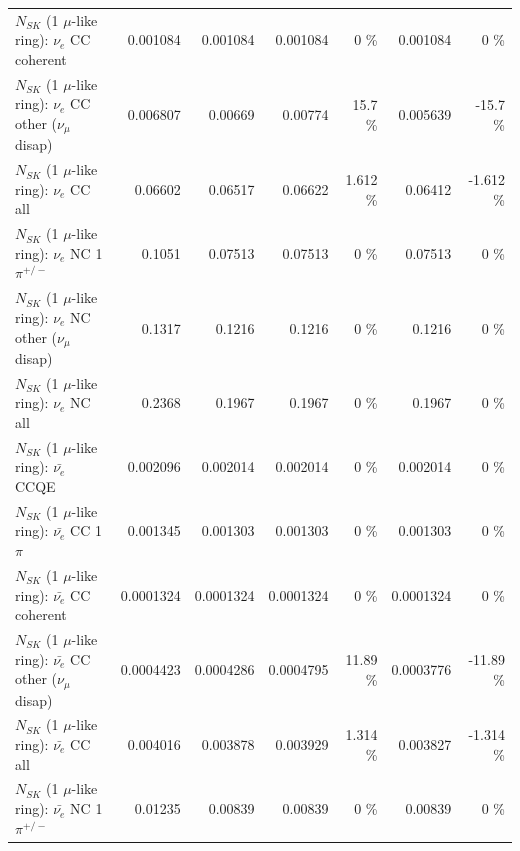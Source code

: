\begin{table}
\begin{tabular}{| l | r | r | r  r | r  r |}
                               $N_{SK}$ (1 $\mu$-like ring): $\nu_e$ CC coherent &        0.001084 &        0.001084 &        0.001084 &        0 \%  &        0.001084 &        0 \%  \\ 
                $N_{SK}$ (1 $\mu$-like ring): $\nu_e$ CC other ($\nu_\mu$ disap) &        0.006807 &         0.00669 &         0.00774 &     15.7 \%  &        0.005639 &    -15.7 \%  \\ 
                                  $N_{SK}$ (1 $\mu$-like ring): $\nu_{e}$ CC all &         0.06602 &         0.06517 &         0.06622 &    1.612 \%  &         0.06412 &   -1.612 \%  \\ 
\hline
                           $N_{SK}$ (1 $\mu$-like ring): $\nu_e$ NC 1$\pi^{+/-}$ &          0.1051 &         0.07513 &         0.07513 &        0 \%  &         0.07513 &        0 \%  \\ 
                $N_{SK}$ (1 $\mu$-like ring): $\nu_e$ NC other ($\nu_\mu$ disap) &          0.1317 &          0.1216 &          0.1216 &        0 \%  &          0.1216 &        0 \%  \\ 
                                  $N_{SK}$ (1 $\mu$-like ring): $\nu_{e}$ NC all &          0.2368 &          0.1967 &          0.1967 &        0 \%  &          0.1967 &        0 \%  \\ 
\hline
\hline
\hline
                                $N_{SK}$ (1 $\mu$-like ring): $\bar{\nu_e}$ CCQE &        0.002096 &        0.002014 &        0.002014 &        0 \%  &        0.002014 &        0 \%  \\ 
                           $N_{SK}$ (1 $\mu$-like ring): $\bar{\nu_e}$ CC 1$\pi$ &        0.001345 &        0.001303 &        0.001303 &        0 \%  &        0.001303 &        0 \%  \\ 
                         $N_{SK}$ (1 $\mu$-like ring): $\bar{\nu_e}$ CC coherent &       0.0001324 &       0.0001324 &       0.0001324 &        0 \%  &       0.0001324 &        0 \%  \\ 
          $N_{SK}$ (1 $\mu$-like ring): $\bar{\nu_e}$ CC other ($\nu_\mu$ disap) &       0.0004423 &       0.0004286 &       0.0004795 &    11.89 \%  &       0.0003776 &   -11.89 \%  \\ 
                            $N_{SK}$ (1 $\mu$-like ring): $\bar{\nu_{e}}$ CC all &        0.004016 &        0.003878 &        0.003929 &    1.314 \%  &        0.003827 &   -1.314 \%  \\ 
\hline
                     $N_{SK}$ (1 $\mu$-like ring): $\bar{\nu_e}$ NC 1$\pi^{+/-}$ &         0.01235 &         0.00839 &         0.00839 &        0 \%  &         0.00839 &        0 \%  \\ 

\end{tabular}
\end{table}
